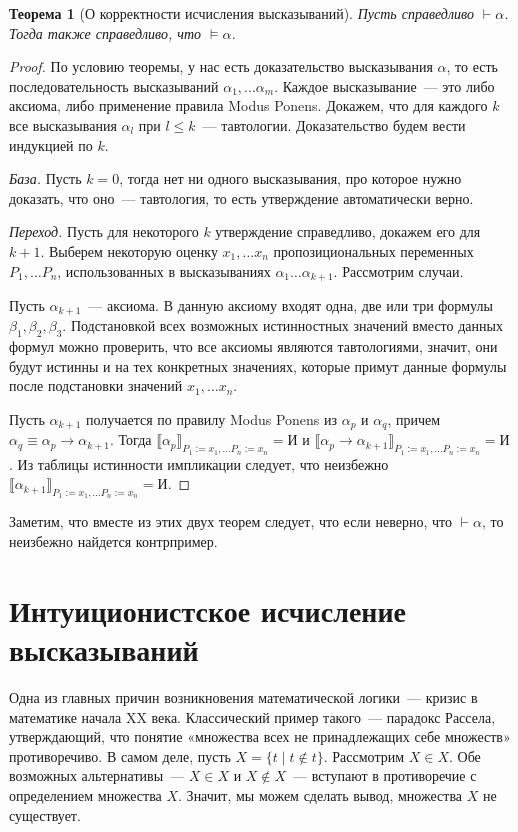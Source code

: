 \documentclass[a4paper,11pt]{article}
\newtheorem{thm}{Теорема}[section]
\theoremstyle{definition}
\newcommand{\sem}[2]{\llbracket #1 \rrbracket_{#2}}
\newcommand{\proves}{\vdash}
\newcommand{\True}{\text{И}}
\begin{document}
\begin{thm}[О корректности исчисления высказываний]
Пусть справедливо $\proves \alpha$. Тогда также справедливо, что $\models
\alpha$.
\end{thm}
\begin{proof}
По условию теоремы, у нас есть доказательство высказывания $\alpha$, то есть
последовательность высказываний $\alpha_1, \dots \alpha_m$. Каждое
высказывание~--- это либо аксиома, либо применение правила Modus Ponens.
Докажем, что для каждого $k$ все высказывания $\alpha_l$ при $l \le k$~---
тавтологии. Доказательство будем вести индукцией по $k$.

\emph{База.} Пусть $k = 0$, тогда нет ни одного высказывания, про которое нужно
доказать, что оно~--- тавтология, то есть утверждение автоматически верно.

\emph{Переход.} Пусть для некоторого $k$ утверждение справедливо, докажем его
для $k+1$. Выберем некоторую оценку $x_1, \dots x_n$ пропозициональных
переменных $P_1, \dots P_n$, использованных в высказываниях $\alpha_1 \dots
\alpha_{k+1}$. Рассмотрим случаи.

Пусть $\alpha_{k+1}$~--- аксиома. В данную аксиому входят одна, две или три
формулы $\beta_1, \beta_2, \beta_3$. Подстановкой всех возможных истинностных
значений вместо данных формул можно проверить, что все аксиомы являются
тавтологиями, значит, они будут истинны и на тех конкретных значениях, которые
примут данные формулы после подстановки значений $x_1, \dots x_n$.

Пусть $\alpha_{k+1}$ получается по правилу Modus Ponens из $\alpha_p$ и
$\alpha_q$, причем $\alpha_q \equiv \alpha_p \to \alpha_{k+1}$. Тогда
$\sem{\alpha_p}{P_1:=x_1,\dots P_n:=x_n} = \True$ и $\sem{\alpha_p \to
\alpha_{k+1}}{P_1:=x_1,\dots P_n:=x_n} = \True$. Из таблицы истинности
импликации следует, что неизбежно $\sem{\alpha_{k+1}}{P_1:=x_1,\dots
P_n:=x_n} = \True$.
\end{proof}

Заметим, что вместе из этих двух теорем следует, что если неверно, что $\proves
\alpha$, то неизбежно найдется контрпример.

\section{Интуиционистское исчисление высказываний}
Одна из главных причин возникновения математической логики~--- кризис в
математике начала XX века. Классический пример такого~--- парадокс Рассела,
утверждающий, что понятие «множества всех не принадлежащих себе множеств»
противоречиво. В самом деле, пусть $X = \{t \mid t \notin t\}$. Рассмотрим $X
\in X$. Обе возможных альтернативы~--- $X \in X$ и $X \notin X$~--- вступают в
противоречие с определением множества $X$. Значит, мы можем сделать вывод,
множества $X$ не существует.
\end{document}
